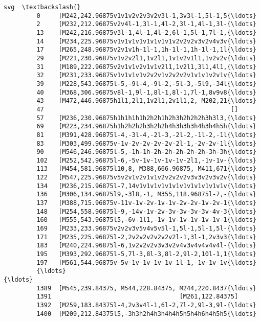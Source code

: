 \documentclass[11pt]{article}
\begin{document}
\begin{Verbatim}[commandchars=\\\{\}]
                                                             svg  \textbackslash{}
         0     [M242,242.96875v1v1v2v2v3v2v3l-1,3v3l-1,5l-1,5{\ldots}   
         2     [M232,212.96875v2v4l-1,3l-1,4l-2,3l-1,4l-1,3l-{\ldots}   
         13    [M242,216.96875v3l-1,4l-1,4l-2,6l-1,5l-1,7l-1,{\ldots}   
         14    [M234,225.96875v1v1v1v1v1v1v1v1v2v2v2v3v2v4v3v{\ldots}   
         17    [M265,248.96875v2v1v1h-1l-1,1h-1l-1,1h-1l-1,1l{\ldots}   
         29    [M221,230.96875v1v2v2l1,1v2l1,1v1v2v1l1,1v2v2v{\ldots}   
         31    [M189,222.96875v2v1v1v2v1v1v2l1,1v2l1,3l1,4l1,{\ldots}   
         32    [M231,233.96875v1v1v1v1v2v2v1v2v2v2v1v1v1v2v1v{\ldots}   
         39    [M228,543.96875l-5,-9l-4,-9l-2,-5l-3,-5l9,-34l{\ldots}   
         40    [M368,306.96875v8l-1,9l-1,8l-1,8l-1,7l-1,8v9v8{\ldots}   
         43    [M472,446.96875h1l1,2l1,1v2l1,2v1l1,2, M202,21{\ldots}   
         47                                                   []   
         57    [M236,230.96875h1h1h1h1h2h2h1h2h3h2h2h2h3h3l3,{\ldots}   
         69    [M223,234.96875h1h2h2h2h3h2h2h4h3h3h3h4h3h4h5h{\ldots}   
         81    [M391,428.96875l-4,-3l-4,-2l-3,-2l-2,-1l-2,-1l{\ldots}   
         83    [M303,499.96875v-1v-2v-2v-2v-2v-2l-1,-2v-2v-1l{\ldots}   
         90    [M546,246.96875l-5,-1h-1h-2h-2h-2h-2h-2h-3h-3h{\ldots}   
         102   [M252,542.96875l-6,-5v-1v-1v-1v-1v-2l1,-1v-1v-{\ldots}   
         113   [M454,581.96875l10,8, M388,666.96875, M411,671{\ldots}   
         122   [M547,225.96875v5v2v1v2v1v1v2v2v2v2v3v3v2v3v2v{\ldots}   
         134   [M236,215.96875l-7,14v1v1v1v1v1v1v1v1v1v1v1v1v{\ldots}   
         136   [M306,134.96875l9,-3l8,-1, M355,118.96875l-7,-{\ldots}   
         137   [M388,715.96875v-11v-1v-2v-1v-1v-2v-2v-1v-2v-1{\ldots}   
         148   [M254,558.96875l-9,-14v-1v-2v-3v-3v-3v-3v-4v-3{\ldots}   
         160   [M555,543.96875l5,-6v-1l1,-1v-1v-1v-1v-1v-1v-1{\ldots}   
         169   [M233,233.96875v2v2v3v5v4v5v5l-1,5l-1,5l-1,5l-{\ldots}   
         171   [M235,225.96875l-2,2v2v2v2v2v2v2l-1,3l-1,2v3v3{\ldots}   
         183   [M240,224.96875l-6,1v2v2v2v3v3v2v4v3v4v4v4v4l-{\ldots}   
         195   [M393,292.96875l-5,7l-3,8l-3,8l-2,9l-2,10l-1,1{\ldots}   
         197   [M561,544.96875v-5v-1v-1v-1v-1v-1l-1,-1v-1v-1v{\ldots}   
         {\ldots}                                                 {\ldots}   
         1389  [M545,239.84375, M544,228.84375, M244,220.8437{\ldots}   
         1391                                   [M261,122.84375]   
         1392  [M259,183.84375l-4,2v3v4l-1,6l-2,7l-2,9l-3,9l-{\ldots}   
         1400  [M209,212.84375l5,-3h3h2h4h3h4h4h5h5h4h6h4h5h5{\ldots}   

\end{Verbatim}
\end{document}
